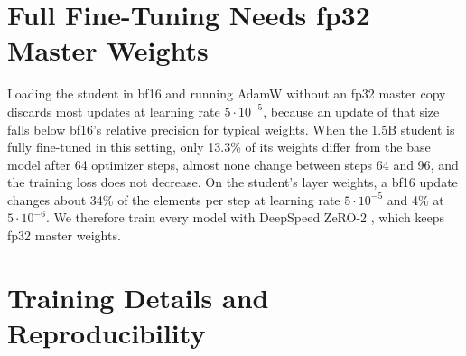 \documentclass[11pt]{article}
\begin{document}

%



\appendix
\renewcommand{\dbltopfraction}{0.85}
\setcounter{dbltopnumber}{3}
\renewcommand{\dblfloatpagefraction}{0.6}
\makeatletter\setlength{\@dblfptop}{0pt}\makeatother %

\section{Full Fine-Tuning Needs fp32 Master Weights}
\label{app:bf16}

Loading the student in bf16 and running AdamW without an fp32 master copy discards most updates at learning rate $5\cdot10^{-5}$, because an update of that size falls below bf16's relative precision for typical weights.
When the 1.5B student is fully fine-tuned in this setting, only 13.3\% of its weights differ from the base model after 64 optimizer steps, almost none change between steps 64 and 96, and the training loss does not decrease.
On the student's layer weights, a bf16 update changes about 34\% of the elements per step at learning rate $5\cdot10^{-5}$ and 4\% at $5\cdot10^{-6}$.
We therefore train every model with DeepSpeed ZeRO-2 \citep{rajbhandari2020zero}, which keeps fp32 master weights.

\section{Training Details and Reproducibility}
\label{app:repro}
\end{document}

